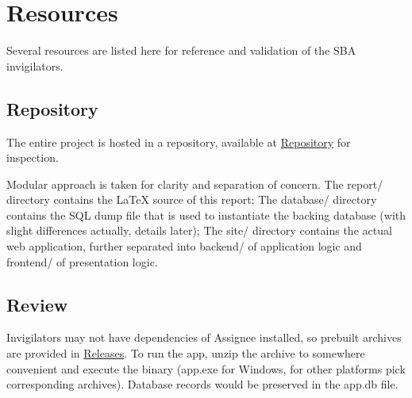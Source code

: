 \section{Resources}
\label{overview.src}

Several resources are listed here for reference and validation of the SBA invigilators.

\subsection{Repository}
\label{overview.src.repo}

The entire project is hosted in a repository, available at \href{https://github.com/CarbonicSoda/assignee}{Repository}
for inspection.

Modular approach is taken for clarity and separation of concern. The report/ directory
contains the \LaTeX{} source of this report; The database/ directory contains
the SQL dump file that is used to instantiate the backing database (with slight differences
actually, details later); The site/ directory contains the actual web application,
further separated into backend/ of application logic and frontend/ of
presentation logic.

\subsection{Review}
\label{overview.src.review}

Invigilators may not have dependencies of Assignee installed, so prebuilt
archives are provided in
\href{https://github.com/CarbonicSoda/assignee/releases}{Releases}. To run the app,
unzip the archive to somewhere convenient and execute the binary (app.exe for Windows,
for other platforms pick corresponding archives). Database records would be
preserved in the app.db file.
